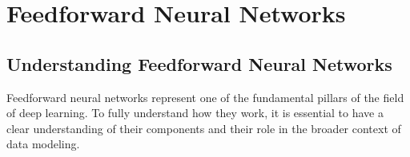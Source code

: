 \section{Feedforward Neural Networks}

\subsection{Understanding Feedforward Neural Networks}

Feedforward neural networks represent one of the fundamental pillars of the field of deep learning. To fully understand how they work, it is essential to have a clear understanding of their components and their role in the broader context of data modeling.

\newcommand\setAngles[3]{
  \pgfmathanglebetweenpoints{\pgfpointanchor{#2}{center}}{\pgfpointanchor{#1}{center}}
  \pgfmathsetmacro\angmin{\pgfmathresult}
  \pgfmathanglebetweenpoints{\pgfpointanchor{#2}{center}}{\pgfpointanchor{#3}{center}}
  \pgfmathsetmacro\angmax{\pgfmathresult}
  \pgfmathsetmacro\dang{\angmax-\angmin}
  \pgfmathsetmacro\dang{\dang<0?\dang+360:\dang}
}

